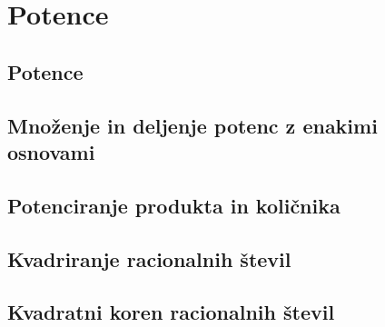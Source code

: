 \section{Potence}

\begin{frame}
    \sectionpage
\end{frame}

\begin{frame}
\end{frame}

    \subsection{Potence}


    \subsection{Množenje in deljenje potenc z enakimi osnovami}


    \subsection{Potenciranje produkta in količnika}


    \subsection{Kvadriranje racionalnih števil}


    \subsection{Kvadratni koren racionalnih števil}

